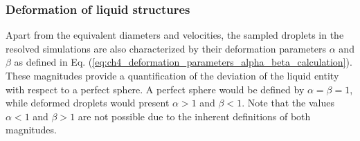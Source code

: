 \subsubsection*{Deformation of liquid structures}
\label{subsubsec:def_liquid_structures}

Apart from the equivalent diameters and velocities, the sampled droplets in the resolved simulations are also characterized by their deformation parameters $\alpha$ and $\beta$ as defined in Eq. (\ref{eq:ch4_deformation_parameters_alpha_beta_calculation}). These magnitudes provide a quantification of the deviation of the liquid entity with respect to a perfect sphere. A perfect sphere would be defined by $\alpha = \beta = 1$, while deformed droplets would present $\alpha > 1$ and $\beta < 1$. Note that the values $\alpha < 1$ and $\beta > 1$ are not possible due to the inherent definitions of both magnitudes.



%
%
%


